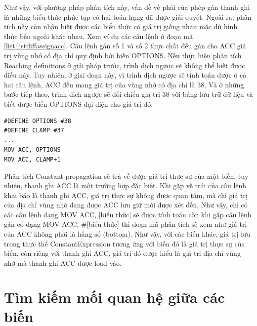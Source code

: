 Như vậy, với phương pháp phân tích này, vấn đề vế phải của phép gán thanh ghi là những biểu thức phức tạp có hai toán hạng đã được giải quyết. Ngoài ra, phân tích này còn nhận biết được các biểu thức có giá trị giống nhau mặc dù hình thức bên ngoài khác nhau. Xem ví dụ các câu lệnh ở đoạn mã \ref{list:listdiffassignacc}. Câu lệnh gán số 1 và số 2 thực chất đều gán cho ACC giá trị vùng nhớ có địa chỉ quy định bởi biến OPTIONS. Nếu thực hiện phân tích Reaching definitions ở giải pháp trước, trình dịch ngược sẽ không thể biết được điều này. Tuy nhiên, ở giai đoạn này, vì trình dịch ngược sẽ tính toán được ở cả hai câu lệnh, ACC đều mang giá trị của vùng nhớ có địa chỉ là 38. Và ở những bước tiếp theo, trình dịch ngược sẽ đối chiếu giá trị 38 với bảng lưu trữ dữ liệu và biết được biến OPTIONS đại diện cho giá trị đó.

\begin{lstlisting}[caption={Một số câu lệnh gán cho ACC có giá trị vế phải bằng nhau},label={list:listdiffassignacc}]
#DEFINE OPTIONS #38
#DEFINE CLAMP #37
...
MOV ACC, OPTIONS
MOV ACC, CLAMP+1
\end{lstlisting}

Phân tích Constant propagation sẽ trả về được giá trị thực sự của một biến, tuy nhiên, thanh ghi ACC là một trường hợp đặc biệt. Khi gặp vế trái của câu lệnh khai báo là thanh ghi ACC, giá trị thực sự không được quan tâm, mà chỉ giá trị của địa chỉ vùng nhớ đang được ACC lưu giữ mới được xét đến. Như vậy, chỉ có các câu lệnh dạng MOV ACC, [biểu thức] sẽ được tính toán còn khi gặp câu lệnh gán có dạng MOV ACC, \#[biểu thức] thì đoạn mã phân tích sẽ xem như giá trị của ACC không phải là hằng số (bottom). Như vậy, với các biến khác, giá trị lưu trong thực thể ConstantExpression tương ứng với biến đó là giá trị thực sự của biến, còn riêng với thanh ghi ACC, giá trị đó được hiểu là giá trị địa chỉ vùng nhớ mà thanh ghi ACC được load vào.
\section{Tìm kiếm mối quan hệ giữa các biến}
